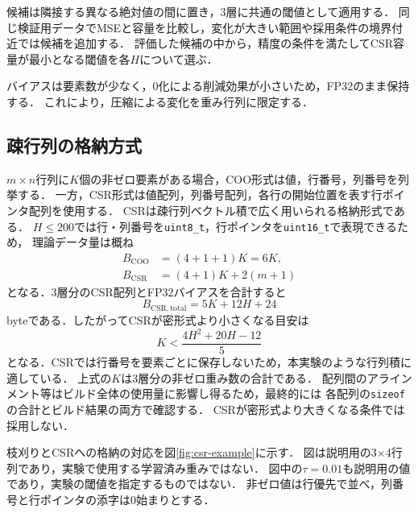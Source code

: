\documentclass[a4paper,11pt]{article}
\begin{document}
候補は隣接する異なる絶対値の間に置き，3層に共通の閾値として適用する．
同じ検証用データでMSEと容量を比較し，変化が大きい範囲や採用条件の境界付近では候補を追加する．
評価した候補の中から，精度の条件を満たしてCSR容量が最小となる閾値を各$H$について選ぶ．

バイアスは要素数が少なく，0化による削減効果が小さいため，FP32のまま保持する．
これにより，圧縮による変化を重み行列に限定する．

\subsection{疎行列の格納方式}

$m\times n$行列に$K$個の非ゼロ要素がある場合，COO形式は値，行番号，列番号を列挙する．
一方，CSR形式は値配列，列番号配列，各行の開始位置を表す行ポインタ配列を使用する．
CSRは疎行列ベクトル積で広く用いられる格納形式である\cite{bell2009}．
$H\leq 200$では行・列番号を\texttt{uint8\_t}，行ポインタを\texttt{uint16\_t}で表現できるため，
理論データ量は概ね
\begin{align}
  B_{\mathrm{COO}} &= (4+1+1)K=6K,\\
  B_{\mathrm{CSR}} &= (4+1)K+2(m+1)
\end{align}
となる．3層分のCSR配列とFP32バイアスを合計すると
\begin{equation}
  B_{\mathrm{CSR,total}}=5K+12H+24
\end{equation}
byteである．したがってCSRが密形式より小さくなる目安は
\begin{equation}
  K<\frac{4H^2+20H-12}{5}
\end{equation}
となる．CSRでは行番号を要素ごとに保存しないため，本実験のような行列積に適している．
上式の$K$は3層分の非ゼロ重み数の合計である．
配列間のアラインメント等はビルド全体の使用量に影響し得るため，最終的には
各配列の\texttt{sizeof}の合計とビルド結果の両方で確認する．
CSRが密形式より大きくなる条件では採用しない．

枝刈りとCSRへの格納の対応を図\ref{fig:csr-example}に示す．
図は説明用の3$\times$4行列であり，実験で使用する学習済み重みではない．
図中の$\tau=0.01$も説明用の値であり，実験の閾値を指定するものではない．
非ゼロ値は行優先で並べ，列番号と行ポインタの添字は0始まりとする．
\end{document}
